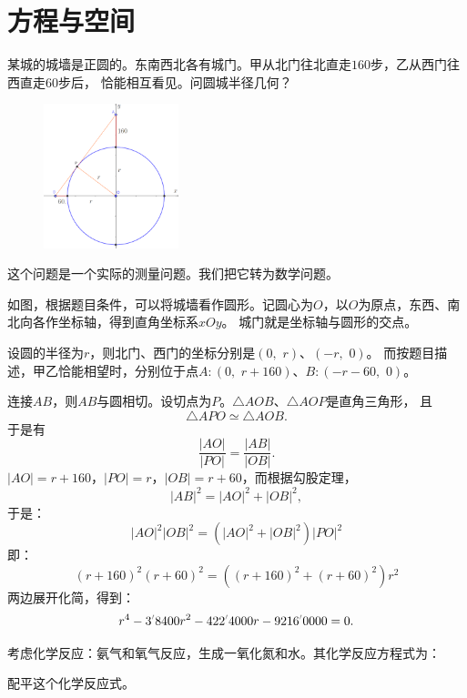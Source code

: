 \documentclass[12pt,UTF8]{ctexbook}
\begin{document}
\chapter{方程与空间}

\begin{ex}
    某城的城墙是正圆的。东南西北各有城门。甲从北门往北直走$160$步，乙从西门往西直走$60$步后，
    恰能相互看见。问圆城半径几何？ %
\end{ex}

\begin{figure} %
    \vspace{-30pt}
    \flushright
    \includegraphics[width=0.35\textwidth]{tu/整式方程1.png}
\end{figure}

这个问题是一个实际的测量问题。我们把它转为数学问题。

如图，根据题目条件，可以将城墙看作圆形。记圆心为$O$，以$O$为原点，东西、南北向各作坐标轴，得到直角坐标系$xOy$。
城门就是坐标轴与圆形的交点。

设圆的半径为$r$，则北门、西门的坐标分别是$(0, \,\, r)$、$(-r, \,\, 0)$。
而按题目描述，甲乙恰能相望时，分别位于点$A:(0, \,\, r+160)$、$B:(-r-60, \,\, 0)$。

连接$AB$，则$AB$与圆相切。设切点为$P$。$\triangle AOB$、$\triangle AOP$是直角三角形，
且
$$ \triangle APO \simeq \triangle AOB.$$
于是有
$$ \frac{|AO|}{|PO|} = \frac{|AB|}{|OB|}.$$
$|AO| = r+160$，$|PO| = r$，$|OB| = r + 60$，而根据勾股定理，
$$ |AB|^2 = |AO|^2 + |OB|^2,$$
于是：
$$ |AO|^2 |OB|^2 = \left(|AO|^2 + |OB|^2\right) |PO|^2 $$
即：
$$ (r+160)^2 (r+60)^2 = \left((r+160)^2 + (r+60)^2\right) r^2 $$
两边展开化简，得到：
$$ r^4 - 3\dlim{8400} r^2 - 422\dlim{4000} r - 9216\dlim{0000} = 0. $$

\begin{ex}
  考虑化学反应：氨气和氧气反应，生成一氧化氮和水。其化学反应方程式为：

\begin{center}
\end{center}

  配平这个化学反应式。
\end{ex}
\end{document}
